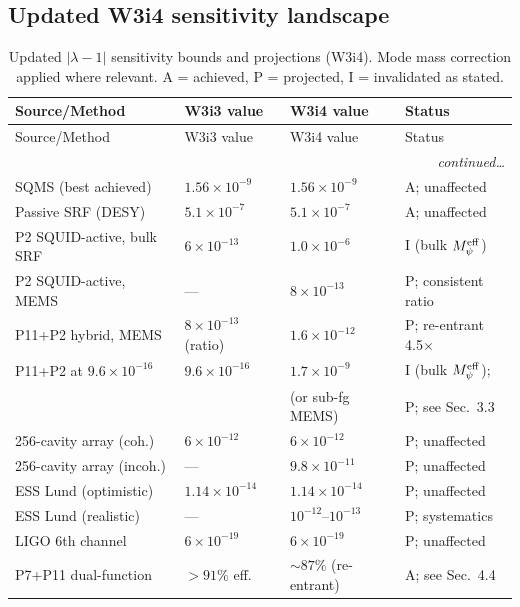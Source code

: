\documentclass[11pt,twocolumn]{article}
\newcommand{\lam}{\lambda}
\newcommand{\Meff}{M_\psi^{\rm eff}}
\newcommand{\ee}[1]{\times 10^{#1}}
\begin{document}
\subsection{Updated W3i4 sensitivity landscape}
\label{sec:updated_landscape}

\begin{longtable}{@{}llll@{}}
\caption{Updated $|\lam-1|$ sensitivity bounds and projections (W3i4).
Mode mass correction applied where relevant.
A = achieved, P = projected, I = invalidated as stated.}
\label{tab:w3i4_bounds}\\
\toprule
Source/Method & W3i3 value & W3i4 value & Status \\
\midrule
\endfirsthead
\toprule
Source/Method & W3i3 value & W3i4 value & Status \\
\midrule
\endhead
\midrule\multicolumn{4}{r}{\textit{continued\ldots}}\\\endfoot
\bottomrule\endlastfoot
%
SQMS (best achieved) & $1.56\ee{-9}$ & $1.56\ee{-9}$ & A; unaffected \\
Passive SRF (DESY)   & $5.1\ee{-7}$  & $5.1\ee{-7}$ & A; unaffected \\
P2 SQUID-active, bulk SRF & $6\ee{-13}$ & $1.0\ee{-6}$ & I (bulk $\Meff$) \\
P2 SQUID-active, MEMS & --- & $8\ee{-13}$ & P; consistent ratio \\
P11+P2 hybrid, MEMS  & $8\ee{-13}$ (ratio) & $1.6\ee{-12}$ & P; re-entrant 4.5$\times$ \\
P11+P2 at $9.6\ee{-16}$ & $9.6\ee{-16}$ & $1.7\ee{-9}$ & I (bulk $\Meff$); \\
         &              & (or sub-fg MEMS) & P; see Sec.~3.3 \\
256-cavity array (coh.) & $6\ee{-12}$ & $6\ee{-12}$ & P; unaffected \\
256-cavity array (incoh.) & --- & $9.8\ee{-11}$ & P; unaffected \\
ESS Lund (optimistic) & $1.14\ee{-14}$ & $1.14\ee{-14}$ & P; unaffected \\
ESS Lund (realistic) & --- & $10^{-12}$--$10^{-13}$ & P; systematics \\
LIGO 6th channel & $6\ee{-19}$ & $6\ee{-19}$ & P; unaffected \\
P7+P11 dual-function  & $>91\%$ eff. & $\sim87\%$ (re-entrant) & A; see Sec.~4.4 \\
\end{longtable}
\end{document}
